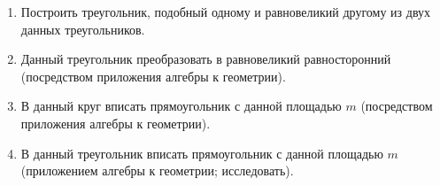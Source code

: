 \begin{enumerate}[resume]
\item
Построить треугольник, подобный одному и равновеликий другому из двух данных треугольников.

\item
Данный треугольник преобразовать в равновеликий равносторонний (посредством приложения алгебры к геометрии).

\item
В данный круг вписать прямоугольник с данной площадью $m$ (посредством приложения алгебры к геометрии).

\item
В данный треугольник вписать прямоугольник с данной площадью $m$ (приложением алгебры к геометрии; исследовать).

\end{enumerate}



